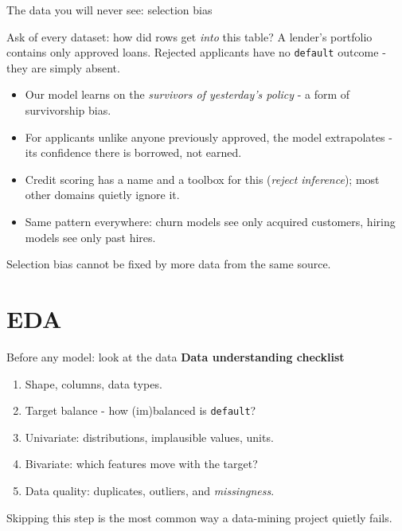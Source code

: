 \documentclass[10pt,aspectratio=169]{beamer}
\begin{document}
\begin{frame}{The data you will never see: selection bias}
  \begin{block}{Ask of every dataset: how did rows get \emph{into} this table?}
    A lender's portfolio contains only \alert{approved} loans. Rejected
    applicants have no \texttt{default} outcome - they are simply absent.
  \end{block}
  \vspace{0.4em}
  \begin{itemize}\small
    \item Our model learns on the \emph{survivors of yesterday's policy} -
          a form of survivorship bias.
    \item For applicants unlike anyone previously approved, the model
          \alert{extrapolates} - its confidence there is borrowed, not earned.
    \item Credit scoring has a name and a toolbox for this
          (\emph{reject inference}); most other domains quietly ignore it.
    \item Same pattern everywhere: churn models see only acquired customers,
          hiring models see only past hires.
  \end{itemize}
  \vspace{0.4em}
  \begin{center}
    Selection bias cannot be fixed by more data \alert{from the same source}.
  \end{center}
\end{frame}

\section{EDA}

\begin{frame}{Before any model: look at the data}
  \textbf{Data understanding checklist}
  \begin{enumerate}\small
    \item Shape, columns, data types.
    \item Target balance - how (im)balanced is \texttt{default}?
    \item Univariate: distributions, implausible values, units.
    \item Bivariate: which features move with the target?
    \item \alert{Data quality}: duplicates, outliers, and \emph{missingness}.
  \end{enumerate}
  \vspace{0.5em}
  \begin{center}
    Skipping this step is the most common way a data-mining project quietly fails.
  \end{center}
\end{frame}
\end{document}
